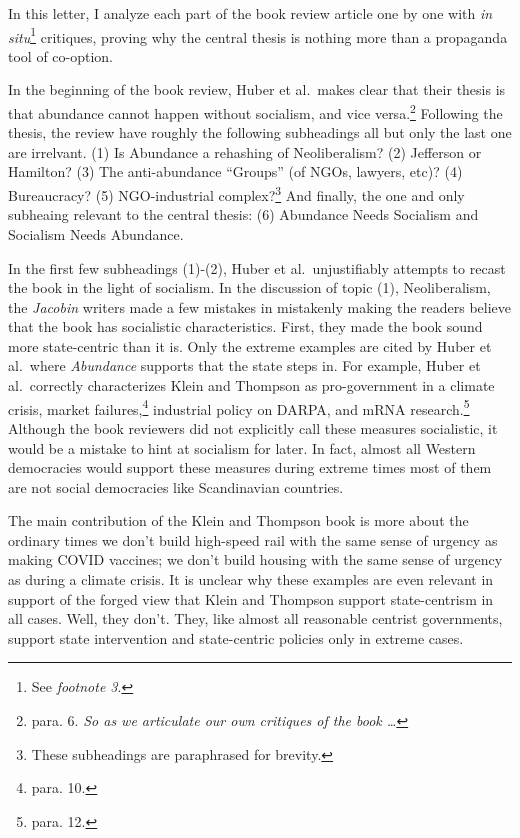 \documentclass[12pt]{article}
\begin{document}
In this letter, I analyze each part of the book review article one by one with \textit{in situ}\footnote{See \textit{footnote 3}.} critiques, proving why the central thesis is nothing more than a propaganda tool of co-option.

In the beginning of the book review, Huber et al.\ makes clear that their thesis is that abundance cannot happen without socialism, and vice versa.\footnote{para. 6. \textit{So as we articulate our own critiques of the book \dots}} Following the thesis, the review have roughly the following subheadings\textemdash{} all but only the last one are irrelvant. (1) Is Abundance a rehashing of Neoliberalism? (2) Jefferson or Hamilton? (3) The anti-abundance ``Groups'' (of NGOs, lawyers, etc)? (4) Bureaucracy? (5) NGO-industrial complex?\footnote{These subheadings are paraphrased for brevity.} And finally, the one and only  subheaing relevant to the central thesis: (6) Abundance Needs Socialism and Socialism Needs Abundance.

In the first few subheadings (1)-(2), Huber et al.\ unjustifiably attempts to recast the book in the light of socialism. In the discussion of topic (1), Neoliberalism, the \textit{Jacobin} writers made a few mistakes in mistakenly making the readers believe that the book has socialistic characteristics. First, they made the book sound more state-centric than it is. Only the extreme examples are cited by Huber et al.\ where \textit{Abundance} supports that the state steps in. For example, Huber et al.\ correctly characterizes Klein and Thompson as pro-government in a climate crisis, market failures,\footnote{para. 10.} industrial policy on DARPA, and mRNA research.\footnote{para. 12.} Although the book reviewers did not explicitly call these measures socialistic, it would be a mistake to hint at socialism for later. In fact, almost all Western democracies would support these measures during extreme times\textemdash{} most of them are not social democracies like Scandinavian countries. 

The main contribution of the Klein and Thompson book is more about the ordinary times\textemdash{} we don't build high-speed rail with the same sense of urgency as making COVID vaccines; we don't build housing with the same sense of urgency as during a climate crisis. It is unclear why these examples are even relevant in support of the forged view that Klein and Thompson support state-centrism in all cases. Well, they don't. They, like almost all reasonable centrist governments, support state intervention and state-centric policies only in extreme cases.
\end{document}
